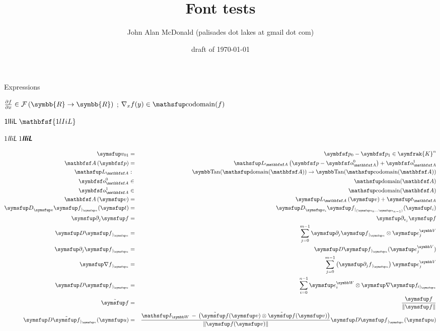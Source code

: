 \documentclass{PalisadesLakesArticle}
\title{Font tests}
\author{John Alan McDonald 
(palisades dot lakes at gmail dot com)}
\date{draft of \today}
\begin{document}
\def\sharedFolder{../shared/}

\begin{plSection}{Expressions}

$
\frac{\partial f}{\partial x} 
\in \mathcal{F}\left(\symbb{R} \rightarrow \symbb{R}\right)$
;
$\nabla_{x} f (y) \in \codomain ( f )$

$\mathsf{1lIiL} \; \mathbfsf{1lIiL}$

$\mathsfit{1lIiL} \; \mathbfsfit{1lIiL}$

\begin{eqnarray}
\Vector{v_{01}} & = & \Point{p}_{0} - \Point{p}_{1} \in \symfrak{K}^n
\\
\Affine{A} \left( \Point{p} \right)
& = & 
\Linear{L}_{\Affine{A}} 
\left( 
\Point{p} - \Point{o}_{\Affine{A}}^{0}
 \right) 
+ 
\Point{o}_{\Affine{A}}^{1}
\\
\Linear{L}_{\Affine{A}} & : &\TangentSpace(\domain(\Affine{A}))
\rightarrow \TangentSpace(\codomain(\Affine{A}))
\\
\Point{o}_{\Affine{A}}^{0} & \in & \domain(\Affine{A})
\\
\Point{o}_{\Affine{A}}^{1} & \in & \codomain(\Affine{A})
\\
\Affine{A} \left( \Vector{v} \right)
& = & 
\Vector{L}_{\Affine{A}} \left( \Vector{v} \right)
+ \Vector{t}_{\Affine{A}} 
\\
\Derivative[\Vector{v}]{\Vector{f}}[\Vector{u}][\Vector{t}]
& = &
\Derivative[\Vector{v}_i]{\Vector{f}}
[(\Vector{u}_0 \ldots \Vector{u}_{n-1})][\Vector{t}_i] 
\\
\Partial{j}{\Vector{f}} & = &\Partial{v_j}{\Vector{f}} 
\\
\Derivative{\Vector{f}}[\Vector{u}]
& = &
\sum_{j=0}^{m-1} \Partial{j}{\Vector{f}}[\Vector{u}] 
\otimes \Vector{e}_j^{\Space{V}}
\\
\Partial{j}{\Vector{f}}[\Vector{u}]
& = &
\Derivative{\Vector{f}}[\Vector{u}] [\Vector{e}_j^{\Space{V}}]
\\
\Gradient{f}[\Vector{u}] 
& = &
\sum_{j=0}^{m-1} 
\left( 
\Partial{j}{f}[\Vector{u}] 
\right) \Vector{e}_j^{\Space{V}}
\\
\Derivative{\Vector{f}}[\Vector{u}]
& = &
 \sum_{i=0}^{n-1}  
\Vector{e}_i^{\Space{W}} 
\otimes \Gradient{\Vector{f}_i}[\Vector{u}]
\\
\tilde{\Vector{f}}  
& = &
\frac{\Vector{f}}{\| \Vector{f} \|}
\\
\Derivative{\tilde{\Vector{f}}}[\Vector{v}][\Vector{u}]
& = &
\frac{\Identity_{\Space{W}} 
\,-\, 
\left( 
\tilde{\Vector{f}}(\Vector{v})
 \otimes 
 \tilde{\Vector{f}}(\Vector{v}) \right)  
 }
{\| \Vector{f}(\Vector{v}) \|}
\Derivative{\Vector{f}}[\Vector{v}][\Vector{u}] 
\end{eqnarray}



\end{plSection}
\end{document}
